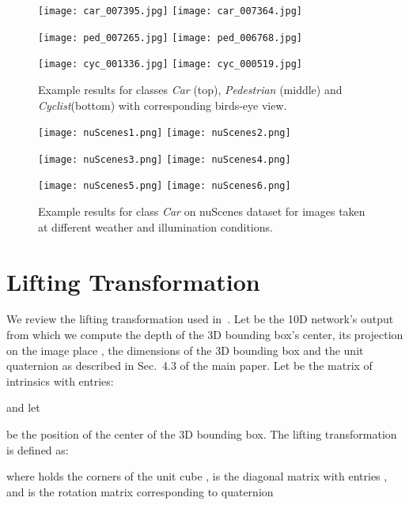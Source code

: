 \documentclass[10pt,twocolumn,letterpaper]{article}
\begin{document}
\begin{figure*}[p]
    \centering
    \texttt{[image: car\_007395.jpg]}
    \texttt{[image: car\_007364.jpg]}

    \vspace{15pt}
    \texttt{[image: ped\_007265.jpg]}
    \texttt{[image: ped\_006768.jpg]}

    \vspace{15pt}
    \texttt{[image: cyc\_001336.jpg]}
    \texttt{[image: cyc\_000519.jpg]}
    \caption{Example results for classes \textit{Car} (top), \textit{Pedestrian} (middle) and \textit{Cyclist}(bottom) with corresponding birds-eye view.}
    \label{fig:car_viz}
\end{figure*}

\begin{figure*}[p]
    \centering
    \texttt{[image: nuScenes1.png]}\hfill
    \texttt{[image: nuScenes2.png]}

    \vspace{15pt}
    \texttt{[image: nuScenes3.png]}\hfill
    \texttt{[image: nuScenes4.png]}

    \vspace{15pt}
    \texttt{[image: nuScenes5.png]}\hfill
    \texttt{[image: nuScenes6.png]}
    \caption{Example results for class \textit{Car} on nuScenes dataset for images taken at different weather and illumination conditions.}
    \label{fig:nuscenesViz}
\end{figure*}

\section{Lifting Transformation}\label{sec:lifting}
We review the lifting transformation used in~\cite{Manhardt_2019_CVPR}.
Let  be the 10D network's output from which we compute the depth  of the 3D bounding box's center, its projection on the image place , the dimensions of the 3D bounding box  and the unit quaternion  as described in Sec.~4.3 of the main paper. Let  be the  matrix of intrinsics with entries:

and let

be the position of the center of the 3D bounding box.
The lifting transformation is defined as:

where  holds the corners of the unit cube ,  is the diagonal matrix with entries , and  is the  rotation matrix corresponding to quaternion 
\end{document}

